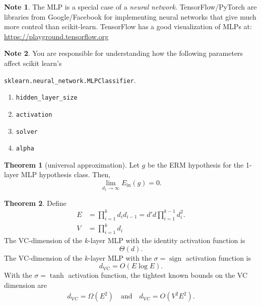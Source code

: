 \documentclass[10pt]{exam}
\theoremstyle{definition}
\newtheorem{note}{Note}
\newtheorem{theorem}{Theorem}
\DeclareMathOperator{\sign}{sign}
\newcommand{\Ein}{E_{\text{in}}}
\newcommand{\dvc}{{d_{\text{VC}}}}
\begin{document}
\begin{note}
    The MLP is a special case of a \emph{neural network}.
    TensorFlow/PyTorch are libraries from Google/Facebook for implementing neural networks that give much more control than scikit-learn.
%
    TensorFlow has a good visualization of MLPs at:
    \url{https://playground.tensorflow.org}
\end{note}

\begin{note}
    You are responsible for understanding how the following parameters affect scikit learn's

    \noindent
    \lstinline{sklearn.neural_network.MLPClassifier}.
    \begin{enumerate}
        \item \lstinline{hidden_layer_size}
        \item \lstinline{activation}
        \item \lstinline{solver}
        \item \lstinline{alpha}
    \end{enumerate}
\end{note}


\newpage
\begin{theorem}[universal approximation]
    Let $g$ be the ERM hypothesis for the 1-layer MLP hypothesis class.
    Then,
    \begin{equation}
        \lim_{d_1\to\infty} \Ein(g) = 0
        .
    \end{equation}
\end{theorem}

\begin{theorem}
    Define
    \begin{align}
        \label{eq:E}
        E &= \prod_{i=1}^k d_i d_{i-1} = d'd \prod_{i=1}^{k-1} d_i^2.
        \\
        V &= \prod_{i=1}^k d_i
    \end{align}
    The VC-dimension of the $k$-layer MLP with the identity activation function is
    \begin{equation}
        \Theta(d)
        .
    \end{equation}
    The VC-dimension of the $k$-layer MLP with the $\sigma=\sign$ activation function is
    \begin{equation}
        \dvc = O(E \log E)
        .
    \end{equation}
    With the $\sigma=\tanh$ activation function, the tightest known bounds on the VC dimension are
    \begin{align}
        \dvc = \Omega(E^2) \quad\text{and}\quad
        \dvc = O(V^2 E^2)
        .
    \end{align}
\end{theorem}
\end{document}
